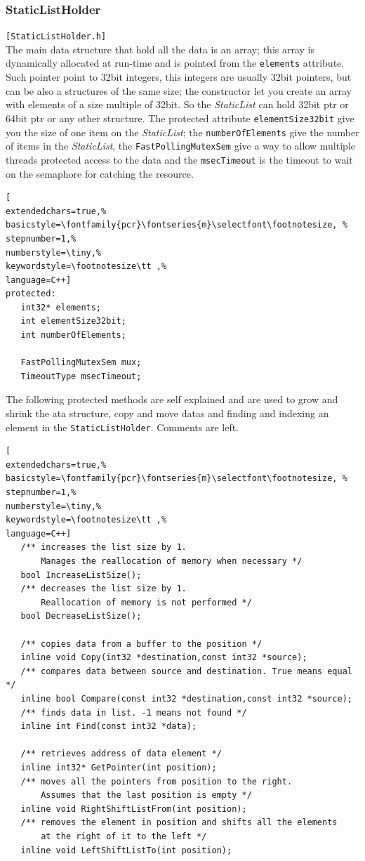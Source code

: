 \subsubsection{StaticListHolder}
\texttt{[StaticListHolder.h]}\\
The main data structure that hold all the data is an array; this array is dynamically allocated at run-time and is pointed from the \texttt{elements} attribute. Such pointer point to 32bit integers, this integers are usually 32bit pointers, but can be also a structures of the same size; the constructor let you create an array with elements of a size multiple of 32bit. So the \textit{StaticList} can hold 32bit ptr or 64bit ptr or any other structure.
The protected attribute \texttt{elementSize32bit} give you the size of one item on the \textit{StaticList}; the \texttt{numberOfElements} give the number of items in the \textit{StaticList}, the \texttt{FastPollingMutexSem} give a way to allow multiple threads protected access to the data and the \texttt{msecTimeout} is the timeout to wait on the semaphore for catching the resource.

\begin{lstlisting}[
extendedchars=true,%
basicstyle=\fontfamily{pcr}\fontseries{m}\selectfont\footnotesize, %
stepnumber=1,%
numberstyle=\tiny,%
keywordstyle=\footnotesize\tt ,%
language=C++]
protected:
   int32* elements;
   int elementSize32bit;
   int numberOfElements;

   FastPollingMutexSem mux;
   TimeoutType msecTimeout;
\end{lstlisting} 

The following protected methods are self explained and are used to grow and shrink the ata structure, copy and move datas and finding and indexing an element in the \texttt{StaticListHolder}. Comments are left.

\begin{lstlisting}[
extendedchars=true,%
basicstyle=\fontfamily{pcr}\fontseries{m}\selectfont\footnotesize, %
stepnumber=1,%
numberstyle=\tiny,%
keywordstyle=\footnotesize\tt ,%
language=C++]
   /** increases the list size by 1.
       Manages the reallocation of memory when necessary */
   bool IncreaseListSize();
   /** decreases the list size by 1.
       Reallocation of memory is not performed */
   bool DecreaseListSize();

   /** copies data from a buffer to the position */
   inline void Copy(int32 *destination,const int32 *source);
   /** compares data between source and destination. True means equal */
   inline bool Compare(const int32 *destination,const int32 *source);
   /** finds data in list. -1 means not found */
   inline int Find(const int32 *data);

   /** retrieves address of data element */
   inline int32* GetPointer(int position);
   /** moves all the pointers from position to the right.
       Assumes that the last position is empty */
   inline void RightShiftListFrom(int position);
   /** removes the element in position and shifts all the elements 
       at the right of it to the left */
   inline void LeftShiftListTo(int position);
\end{lstlisting}

